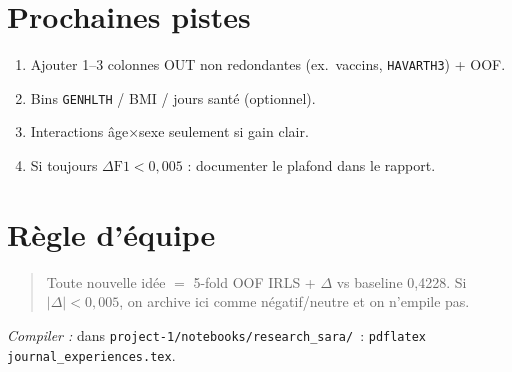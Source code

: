 \documentclass[11pt,a4paper]{article}
\begin{document}
\section{Prochaines pistes}
\begin{enumerate}
  \item Ajouter 1--3 colonnes OUT non redondantes (ex.\ vaccins, \texttt{HAVARTH3}) + OOF.
  \item Bins \texttt{GENHLTH} / BMI / jours santé (optionnel).
  \item Interactions âge$\times$sexe seulement si gain clair.
  \item Si toujours $\Delta\mathrm{F1}<0{,}005$ : documenter le plafond dans le rapport.
\end{enumerate}

\section{Règle d'équipe}
\begin{quote}
Toute nouvelle idée $=$ 5-fold OOF IRLS + $\Delta$ vs baseline 0{,}4228.
Si $|\Delta|<0{,}005$, on archive ici comme négatif/neutre et on n'empile pas.
\end{quote}

\noindent\textit{Compiler :} dans \texttt{project-1/notebooks/research\_sara/}~:
\texttt{pdflatex journal\_experiences.tex}.
\end{document}
